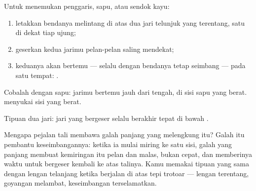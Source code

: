 \begin{method}\label{met:g2:balance-equilibrium:find}
Untuk menemukan  penggaris, sapu, atau sendok kayu:
\begin{enumerate}
  \item letakkan bendanya melintang di atas dua jari telunjuk yang
        terentang, satu di dekat tiap ujung;
  \item geserkan kedua jarimu pelan-pelan saling mendekat;
  \item keduanya akan bertemu --- selalu dengan bendanya tetap
        seimbang --- pada satu tempat: .
\end{enumerate}
Cobalah dengan sapu: jarimu bertemu jauh dari tengah, di sisi sapu
yang berat.  menyukai sisi yang berat.
\end{method}

\begin{omfigure}

{\small Tipuan dua jari: jari yang bergeser selalu berakhir tepat di
bawah .}
\end{omfigure}

\begin{example}\label{ex:g2:balance-equilibrium:acrobat}
Mengapa pejalan tali membawa galah panjang yang melengkung itu? Galah
itu pembantu keseimbangannya: ketika ia mulai miring ke satu sisi,
galah yang panjang membuat kemiringan itu pelan dan malas, bukan
cepat, dan memberinya waktu untuk bergeser kembali ke atas talinya.
Kamu memakai tipuan yang sama dengan lengan telanjang ketika berjalan
di atas tepi trotoar --- lengan terentang, goyangan melambat,
keseimbangan terselamatkan.
\end{example}

